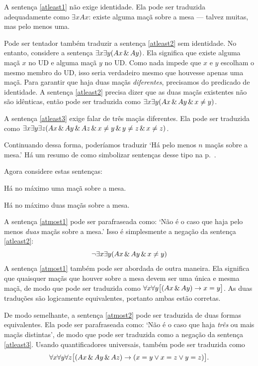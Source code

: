 A sentença \ref{atleast1} não exige identidade. Ela pode ser traduzida adequadamente como $\exists x Ax$: existe alguma maçã sobre a mesa — talvez muitas, mas pelo menos uma.

Pode ser tentador também traduzir a sentença \ref{atleast2} sem identidade. No entanto, considere a sentença $\exists x \exists y(Ax \,\&\, Ay)$. Ela significa que existe alguma maçã $x$ no UD e alguma maçã $y$ no UD. Como nada impede que $x$ e $y$ escolham o mesmo membro do UD, isso seria verdadeiro mesmo que houvesse apenas uma maçã. Para garantir que haja duas maçãs \emph{diferentes}, precisamos do predicado de identidade. A sentença \ref{atleast2} precisa dizer que as duas maçãs existentes não são idênticas, então pode ser traduzida como $\exists x \exists y(Ax \,\&\, Ay \,\&\, x\neq y)$.

A sentença \ref{atleast3} exige falar de três maçãs diferentes. Ela pode ser traduzida como $\exists x \exists y\exists z(Ax \,\&\, Ay \,\&\, Az \,\&\, x\neq y \,\&\, y\neq z \,\&\, x \neq z)$.

Continuando dessa forma, poderíamos traduzir `Há pelo menos $n$ maçãs sobre a mesa.' Há um resumo de como simbolizar sentenças desse tipo na p.~\pageref{summary.atleast}.


Agora considere estas sentenças:
\begin{earg}
\item[\ex{atmost1}] Há no máximo uma maçã sobre a mesa.
\item[\ex{atmost2}] Há no máximo duas maçãs sobre a mesa.
\end{earg}

A sentença \ref{atmost1} pode ser parafraseada como: `Não é o caso que haja pelo menos \emph{duas} maçãs sobre a mesa.' Isso é simplesmente a negação da sentença \ref{atleast2}:
$$\neg \exists x \exists y(Ax \,\&\, Ay \,\&\, x\neq y)$$
A sentença \ref{atmost1} também pode ser abordada de outra maneira. Ela significa que quaisquer maçãs que houver sobre a mesa devem ser uma única e mesma maçã, de modo que pode ser traduzida como $\forall x\forall y\bigl[(Ax \,\&\, Ay) \rightarrow x=y\bigr]$. As duas traduções são logicamente equivalentes, portanto ambas estão corretas.

De modo semelhante, a sentença \ref{atmost2} pode ser traduzida de duas formas equivalentes. Ela pode ser parafraseada como: `Não é o caso que haja \emph{três} ou mais maçãs distintas', de modo que pode ser traduzida como a negação da sentença \ref{atleast3}. Usando quantificadores universais, também pode ser traduzida como
$$\forall x\forall y\forall z\bigl[(Ax \,\&\, Ay \,\&\, Az) \rightarrow (x=y \vee x=z \vee y=z)\bigr].$$

